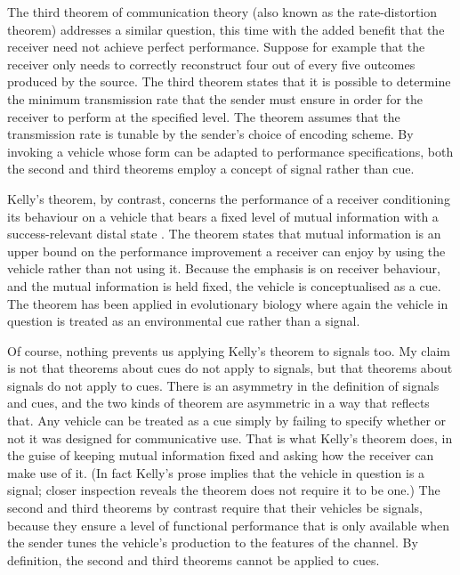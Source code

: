 \documentclass[12pt]{article}
\begin{document}
The third theorem of communication theory (also known as the rate-distortion theorem) addresses a similar question, this time with the added benefit that the receiver need not achieve perfect performance.
Suppose for example that the receiver only needs to correctly reconstruct four out of every five outcomes produced by the source.
The third theorem states that it is possible to determine the minimum transmission rate that the sender must ensure in order for the receiver to perform at the specified level.
The theorem assumes that the transmission rate is tunable by the sender's choice of encoding scheme.
By invoking a vehicle whose form can be adapted to performance specifications, both the second and third theorems employ a concept of signal rather than cue.

Kelly's theorem, by contrast, concerns the performance of a receiver conditioning its behaviour on a vehicle that bears a fixed level of mutual information with a success-relevant distal state \citep{kelly1956new}.
The theorem states that mutual information is an upper bound on the performance improvement a receiver can enjoy by using the vehicle rather than not using it.
Because the emphasis is on receiver behaviour, and the mutual information is held fixed, the vehicle is conceptualised as a cue.
The theorem has been applied in evolutionary biology \citep{donaldson-matasci2010fitness} where again the vehicle in question is treated as an environmental cue rather than a signal.

Of course, nothing prevents us applying Kelly's theorem to signals too.
My claim is not that theorems about cues do not apply to signals, but that theorems about signals do not apply to cues.
There is an asymmetry in the definition of signals and cues, and the two kinds of theorem are asymmetric in a way that reflects that.
Any vehicle can be treated as a cue simply by failing to specify whether or not it was designed for communicative use.
That is what Kelly's theorem does, in the guise of keeping mutual information fixed and asking how the receiver can make use of it.
(In fact Kelly's prose implies that the vehicle in question is a signal; closer inspection reveals the theorem does not require it to be one.)
The second and third theorems by contrast require that their vehicles be signals, because they ensure a level of functional performance that is only available when the sender tunes the vehicle's production to the features of the channel.
By definition, the second and third theorems cannot be applied to cues.
\end{document}
